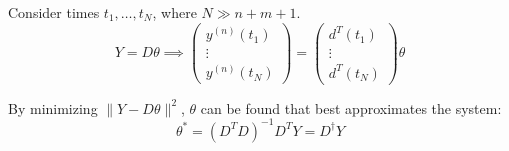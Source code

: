 \documentclass[11pt]{article}
\begin{document}
Consider times \(t_{1}, \dots, t_{N}\), where \(N \gg n + m + 1\).
$$ Y = D \theta \implies \begin{pmatrix} y^{(n)} (t_{1}) \\ \vdots \\ y^{(n)} (t_{N}) \end{pmatrix} = \begin{pmatrix} d^{T} (t_{1}) \\ \vdots \\ d^{T} (t_{N}) \end{pmatrix} \theta $$

By minimizing \(\| Y - D \theta\|^{2}\), \(\theta\) can be found that best approximates the system:
$$
\theta^{*} = (D^{T}D)^{-1} D^{T} Y = D^{\dagger} Y
$$
\end{document}
